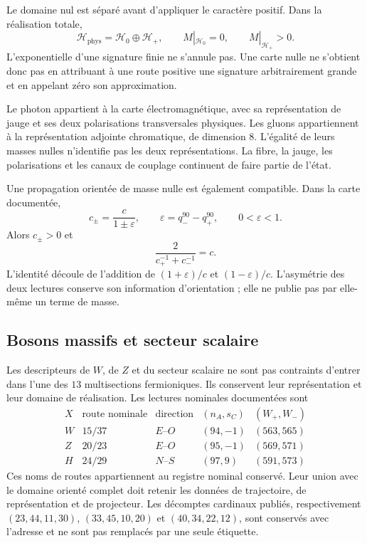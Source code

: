 Le domaine nul est séparé avant d’appliquer le caractère positif. Dans la
réalisation totale,
\[
 \mathcal H_{\mathrm{phys}}=\mathcal H_0\oplus\mathcal H_+,
 \qquad M|_{\mathcal H_0}=0,\qquad M|_{\mathcal H_+}>0.
\]
L'exponentielle d'une signature finie ne s'annule pas. Une carte nulle
ne s'obtient donc pas en attribuant à une route positive une signature arbitrairement
grande et en appelant zéro son approximation.

Le photon appartient à la carte électromagnétique, avec sa représentation
de jauge et ses deux polarisations transversales physiques. Les gluons
appartiennent à la représentation adjointe chromatique, de dimension \(8\).
L'égalité de leurs masses nulles n'identifie pas les deux représentations.
La fibre, la jauge, les polarisations et les canaux de couplage
continuent de faire partie de l'état.

Une propagation orientée de masse nulle est également compatible. Dans la
carte documentée,
\[
 c_\pm=\frac{c}{1\pm\varepsilon},\qquad
 \varepsilon=q_-^{90}-q_+^{90},\qquad0<\varepsilon<1.
\]
Alors \(c_\pm>0\) et
\[
 \frac{2}{c_+^{-1}+c_-^{-1}}=c.
\]
L'identité découle de l'addition de \((1+\varepsilon)/c\) et
\((1-\varepsilon)/c\). L'asymétrie des deux lectures conserve son
information d'orientation ; elle ne publie pas par elle-même un terme de masse.

\subsection{Bosons massifs et secteur scalaire}
\label{vi:vi:subsec:bosones-familias}

Les descripteurs de \(W\), de \(Z\) et du secteur scalaire ne sont pas contraints
d’entrer dans l’une des \(13\) multisections fermioniques. Ils conservent leur
représentation et leur domaine de réalisation. Les lectures nominales
documentées sont
\[
\begin{array}{c|c|c|c|c}
 X&\text{route nominale}&\text{direction}&(n_A,s_C)&(W_+,W_-)\\\hline
 W&15/37&E\text{--}O&(94,-1)&(563,565)\\
 Z&20/23&E\text{--}O&(95,-1)&(569,571)\\
 H&24/29&N\text{--}S&(97,9)&(591,573)
\end{array}
\]
Ces noms de routes appartiennent au registre nominal conservé. Leur
union avec le domaine orienté complet doit retenir les données de
trajectoire, de représentation et de projecteur. Les décomptes cardinaux
publiés, respectivement \((23,44,11,30)\), \((33,45,10,20)\) et
\((40,34,22,12)\), sont conservés avec l'adresse et ne sont pas remplacés
par une seule étiquette.

